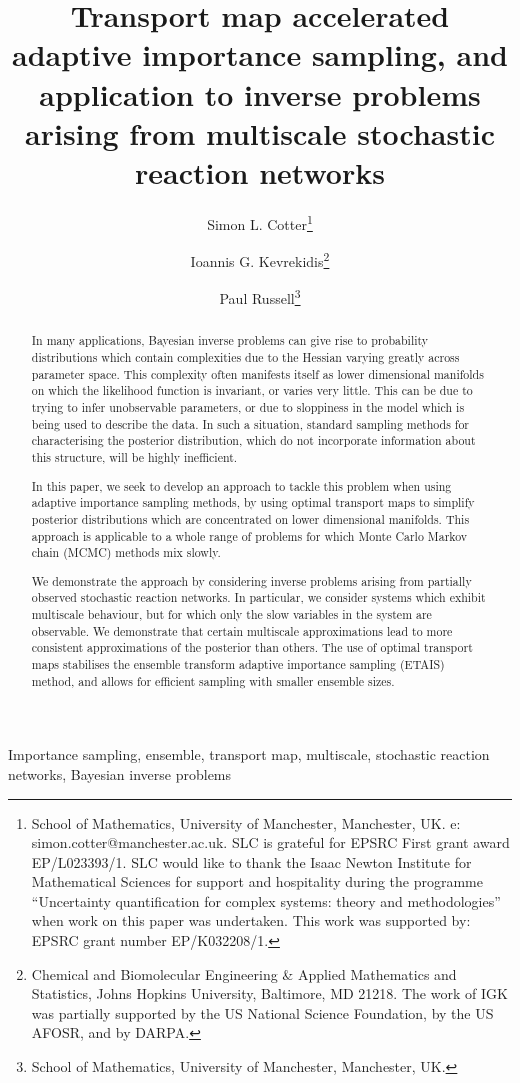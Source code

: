\documentclass[final]{siamltex}
\author{Simon L. Cotter\thanks{School of
    Mathematics, University of Manchester, Manchester, UK. e:
    simon.cotter@manchester.ac.uk. SLC is grateful for EPSRC First
    grant award EP/L023393/1. SLC would like to thank the Isaac Newton
    Institute for Mathematical Sciences for support and hospitality
    during the programme ``Uncertainty quantification for complex systems: theory and methodologies'' when work on this paper was undertaken. This work was supported by:
EPSRC grant number EP/K032208/1.} \and Ioannis
G. Kevrekidis\thanks{Chemical and Biomolecular Engineering \& Applied
  Mathematics and Statistics, Johns Hopkins University, Baltimore, MD
  21218. The work of IGK was partially supported by the US National
  Science Foundation, by the US AFOSR, and by DARPA.} \and Paul
  Russell\thanks{School of
    Mathematics, University of Manchester, Manchester, UK.}}
\title{Transport map accelerated adaptive importance sampling, and application to inverse problems arising from
  multiscale stochastic reaction networks}
\begin{document}
\maketitle
\begin{abstract}
In many applications, Bayesian inverse problems can give rise to
probability distributions which contain complexities due to the
Hessian varying greatly across parameter space. This complexity often manifests itself as lower
dimensional manifolds on which the likelihood function is
invariant, or varies very little. This can be due to trying to infer
unobservable parameters, or due to sloppiness in the model which is
being used to describe the data. In such a situation, standard
sampling methods for characterising the posterior distribution, which
do not incorporate information about this structure, will be highly
inefficient. 

In this paper, we seek to develop an approach to
tackle this problem when using adaptive importance sampling methods,
by using optimal transport maps to simplify
posterior distributions which are concentrated on lower dimensional
manifolds. This approach is applicable to a whole range of
problems for which Monte Carlo Markov chain (MCMC) methods mix slowly.

We demonstrate the approach by considering inverse problems arising
from partially observed stochastic reaction networks. In particular,
we consider systems which exhibit multiscale behaviour, but for which
only the slow variables in the system are observable. We demonstrate
that certain multiscale approximations lead to more consistent
approximations of the posterior than others. The use of optimal
transport maps stabilises the ensemble transform adaptive importance
sampling (ETAIS) method, and allows for efficient sampling with
smaller ensemble sizes.
\end{abstract}
\begin{keywords}Importance sampling, ensemble, transport map,
  multiscale, stochastic reaction networks, Bayesian inverse problems
\end{keywords}
\end{document}
